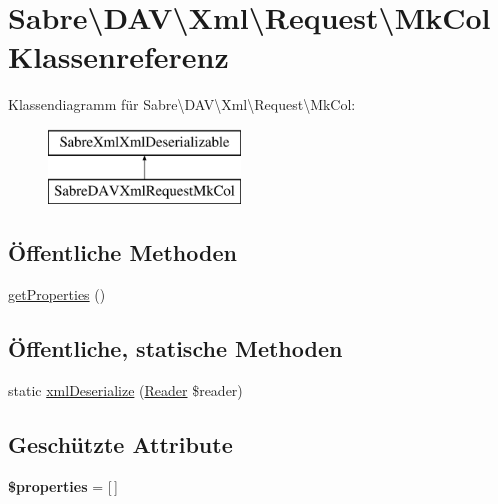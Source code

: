 \hypertarget{class_sabre_1_1_d_a_v_1_1_xml_1_1_request_1_1_mk_col}{}\section{Sabre\textbackslash{}D\+AV\textbackslash{}Xml\textbackslash{}Request\textbackslash{}Mk\+Col Klassenreferenz}
\label{class_sabre_1_1_d_a_v_1_1_xml_1_1_request_1_1_mk_col}
Klassendiagramm für Sabre\textbackslash{}D\+AV\textbackslash{}Xml\textbackslash{}Request\textbackslash{}Mk\+Col\+:\begin{figure}[H]
\begin{center}
\leavevmode
\includegraphics[height=2.000000cm]{class_sabre_1_1_d_a_v_1_1_xml_1_1_request_1_1_mk_col}
\end{center}
\end{figure}
\subsection*{Öffentliche Methoden}
\begin{DoxyCompactItemize}
\item 
\mbox{\hyperlink{class_sabre_1_1_d_a_v_1_1_xml_1_1_request_1_1_mk_col_a111dd4d6b986458e03c6d4ab948b3ee1}{get\+Properties}} ()
\end{DoxyCompactItemize}
\subsection*{Öffentliche, statische Methoden}
\begin{DoxyCompactItemize}
\item 
static \mbox{\hyperlink{class_sabre_1_1_d_a_v_1_1_xml_1_1_request_1_1_mk_col_abdd8702a97c455a2d79d63eeae13285f}{xml\+Deserialize}} (\mbox{\hyperlink{class_sabre_1_1_xml_1_1_reader}{Reader}} \$reader)
\end{DoxyCompactItemize}
\subsection*{Geschützte Attribute}
\begin{DoxyCompactItemize}
\item 
\mbox{\label{class_sabre_1_1_d_a_v_1_1_xml_1_1_request_1_1_mk_col_a7f3b101de458e583465bbf7979ae2b32}} 
{\bfseries \$properties} = \mbox{[}$\,$\mbox{]}
\end{DoxyCompactItemize}


